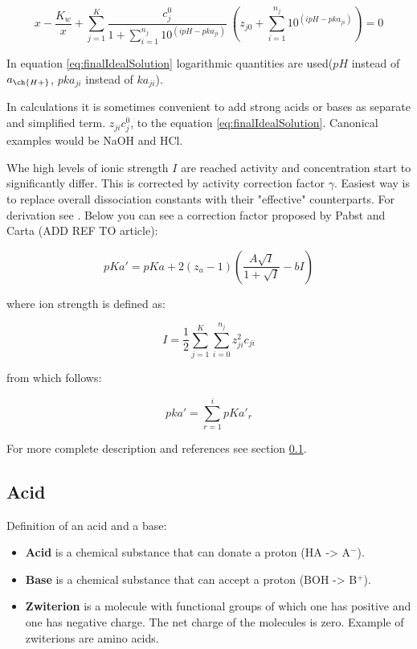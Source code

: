 \begin{equation}\label{eq:finalIdealSolution}
    x - \frac{K_w}{x} + \sum_{j=1}^{K}\frac{c^0_{j}}{1+\sum_{i=1}^{n_j}10^{(i pH - pka_{ji})}} \
    \left(z_{j0} + \sum_{i=1}^{n_j} 10^{(i pH - pka_{ji})}\right) = 0
\end{equation}

In equation \ref{eq:finalIdealSolution} logarithmic quantities are used($pH$ instead of
$a_{\ch{H+}}$, $pka_{ji}$ instead of $ka_{ji}$).

In calculations it is sometimes convenient to add strong acids or bases as separate and simplified
term. $z_{ji}c^0_j$, to the equation \eqref{eq:finalIdealSolution}.
Canonical examples would be NaOH and HCl.

Whe high levels of ionic strength $I$ are reached activity and concentration start to significantly differ.
This is corrected by activity correction factor $\gamma$. Easiest way is to replace overall dissociation
constants with their "effective" counterparts. For derivation see . Below you can see a correction factor
proposed by Pabst and Carta (ADD REF TO article):

\begin{equation}
    pKa' = pKa + 2(z_a-1)\left(\frac{A\sqrt{I}}{1+\sqrt{I}} - bI\right)
\end{equation}

where ion strength is defined as:

\begin{equation}
    I = \frac{1}{2} \sum_{j=1}^{K} \sum_{i=0}^{n_j} z_{ji}^2 c_{ji}
\end{equation}

from which follows:

\begin{equation}
    pka' = \sum_{r=1}^{i} pKa'_r
\end{equation}

For more complete description and references see section \ref{}.

\subsection{Acid}

Definition of an acid and a base:
\begin{itemize}
    \item \textbf{Acid} is a chemical substance that can donate a proton (HA -> A$^-$).
    \item \textbf{Base} is a chemical substance that can accept a proton (BOH -> B$^+$).
    \item \textbf{Zwiterion} is a molecule with functional groups of which one has positive and one has negative charge. The net charge of the molecules is zero. Example of zwiterions are amino acids.
\end{itemize}


